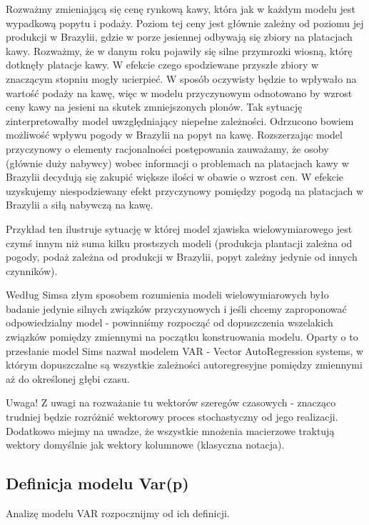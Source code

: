 \documentclass[10pt,a4paper]{book}
\begin{document}
\begin{example}
Rozważmy zmieniającą się cenę rynkową kawy, która jak w każdym modelu jest wypadkową popytu i podaży. Poziom tej ceny jest głównie zależny od poziomu jej produkcji w Brazylii, gdzie w porze jesiennej odbywają się zbiory na platacjach kawy. Rozważmy, że w danym roku pojawiły się silne przymrozki wiosną, którę dotknęły platacje kawy. W efekcie czego spodziewane przyszłe zbiory w znaczącym stopniu mogły ucierpieć. W sposób oczywisty będzie to wpływało na wartość podaży na kawę, więc w modelu przyczynowym odnotowano by wzrost ceny kawy na jesieni na skutek zmniejszonych plonów. Tak sytuację zinterpretowałby model uwzględniający niepełne zależności. Odrzucono bowiem możliwość wpływu pogody w Brazylii na popyt na kawę. Rozszerzając model przyczynowy o elementy racjonalności postępowania zauważamy, że osoby (głównie duży nabywcy) wobec informacji o problemach na platacjach kawy w Brazylii decydują się zakupić większe ilości w obawie o wzrost cen. W efekcie uzyskujemy niespodziewany efekt przyczynowy pomiędzy pogodą na platacjach w Brazylii a siłą nabywczą na kawę. 
\end{example} 
Przykład ten ilustruje sytuację w której model zjawiska wielowymiarowego jest czymś innym niż suma kilku prostszych modeli (produkcja plantacji zależna od pogody, podaż zależna od produkcji w Brazylii, popyt zależny jedynie od innych czynników).

Według Simsa złym sposobem rozumienia modeli wielowymiarowych było badanie jedynie silnych związków przyczynowych i jeśli chcemy zaproponować odpowiedzialny model - powinniśmy rozpocząć od dopuszczenia wszelakich związków pomiędzy zmiennymi na początku konstruowania modelu. Oparty o to przesłanie model Sims nazwał modelem VAR - Vector AutoRegression systems, w którym dopuszczalne są wszystkie zależności autoregresyjne pomiędzy zmiennymi aż do określonej głębi czasu.

Uwaga! Z uwagi na rozważanie tu wektorów szeregów czasowych - znacząco trudniej będzie rozróżnić wektorowy proces stochastyczny od jego realizacji. Dodatkowo miejmy na uwadze, że wszystkie mnożenia macierzowe traktują wektory domyślnie jak wektory kolumnowe (klasyczna notacja).



\subsection{Definicja modelu Var(p)}

Analizę modelu VAR rozpocznijmy od ich definicji.
\end{document}
